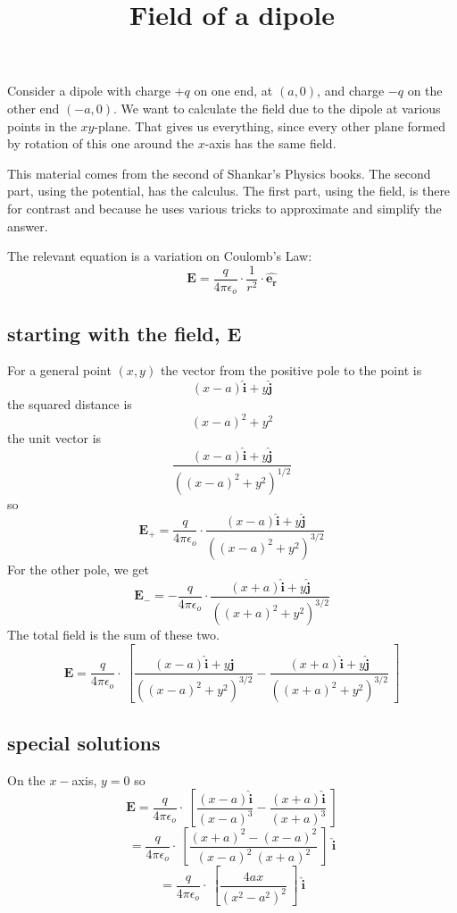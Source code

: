 \documentclass[11pt, oneside]{article}
\title{Field of a dipole}
\date{}
\begin{document}
\maketitle
\Large
Consider a dipole with charge $+q$ on one end, at $(a,0)$, and charge $-q$ on the other end $(-a,0)$.  We want to calculate the field due to the dipole at various points in the $xy$-plane.  That gives us everything, since every other plane formed by rotation of this one around the $x$-axis has the same field.  

This material comes from the second of Shankar's Physics books.  The second part, using the potential, has the calculus.  The first part, using the field, is there for contrast and because he uses various tricks to approximate and simplify the answer.

The relevant equation is a variation on Coulomb's Law:
\[ \mathbf{E} = \frac{q}{4 \pi \epsilon_o} \cdot \frac{1}{r^2} \cdot \hat{\mathbf{e_r}} \]

\subsection*{starting with the field, E}

For a general point $(x,y)$ the vector from the positive pole to the point is
\[ (x - a) \hat{\mathbf{i}} + y \hat{\mathbf{j}} \]
the squared distance is
\[ (x - a)^2 + y^2 \]
the unit vector is
\[ \frac{(x - a) \hat{\mathbf{i}} + y \hat{\mathbf{j}}}{((x - a)^2 + y^2)^{1/2}} \]
so
\[ \mathbf{E}_+ = \frac{q}{4 \pi \epsilon_o} \cdot  \frac{ (x - a) \hat{\mathbf{i}} + y \hat{\mathbf{j}} }{((x - a)^2 + y^2)^{3/2}} \]
For the other pole, we get
\[ \mathbf{E}_- = - \frac{q}{4 \pi \epsilon_o} \cdot  \frac{(x + a) \hat{\mathbf{i}} + y \hat{\mathbf{j}}}{((x + a)^2 + y^2)^{3/2}} \]
The total field is the sum of these two.
\[ \mathbf{E} = \frac{q}{4 \pi \epsilon_o} \cdot \ [ \frac{(x - a) \hat{\mathbf{i}} + y \hat{\mathbf{j}} }{((x - a)^2 + y^2)^{3/2}} - \frac{(x + a) \hat{\mathbf{i}} + y \hat{\mathbf{j}} }{((x + a)^2 + y^2)^{3/2}} \ ] \]

\subsection*{special solutions}
On the $x-$axis, $y = 0$ so 
\[ \mathbf{E} = \frac{q}{4 \pi \epsilon_o} \cdot \ [ \frac{(x - a) \hat{\mathbf{i}}  }{(x - a)^3} - \frac{(x + a) \hat{\mathbf{i}} }{(x + a)^3} \ ] \]
\[ = \frac{q}{4 \pi \epsilon_o} \cdot \ [ \frac{(x + a)^2 - (x - a)^2}{(x - a)^2 \ (x + a)^2} \ ] \ \hat{\mathbf{i}} \]
\[ = \frac{q}{4 \pi \epsilon_o} \cdot \ [ \frac{4ax}{(x^2 - a^2)^2} \ ] \ \hat{\mathbf{i}} \]
\end{document}
